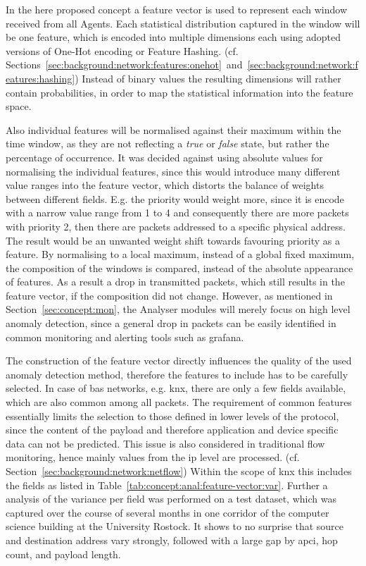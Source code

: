 In the here proposed concept a feature vector is used to represent each window received from all Agents. Each statistical distribution captured in the window will be one feature, which is encoded into multiple dimensions each using adopted versions of One-Hot encoding or Feature Hashing. (cf. Sections~\ref{sec:background:network:features:onehot}~and~\ref{sec:background:network:features:hashing})
Instead of binary values the resulting dimensions will rather contain probabilities, in order to map the statistical information into the feature space.

Also individual features will be normalised against their maximum within the time window, as they are not reflecting a \emph{true} or \emph{false} state, but rather the percentage of occurrence.
It was decided against using absolute values for normalising the individual features, since this would introduce many different value ranges into the feature vector, which distorts the balance of weights between different fields.
E.g. the priority would weight more, since it is encode with a narrow value range from 1 to 4 and consequently there are more packets with priority 2, then there are packets addressed to a specific physical address. The result would be an unwanted weight shift towards favouring priority as a feature.
By normalising to a local maximum, instead of a global fixed maximum, the composition of the windows is compared, instead of the absolute appearance of features.
As a result a drop in transmitted packets, which still results in the feature vector, if the composition did not change.
However, as mentioned in Section~\ref{sec:concept:mon}, the Analyser modules will merely focus on high level anomaly detection, since a general drop in packets can be easily identified in common monitoring and alerting tools such as \gls{grafana}.


The construction of the feature vector directly influences the quality of the used anomaly detection method, therefore the features to include has to be carefully selected. In case of \gls{bas} networks, e.g. \gls{knx}, there are only a few fields available, which are also common among all packets. The requirement of common features essentially limits the selection to those defined in lower levels of the protocol, since the content of the payload and therefore application and device specific data can not be predicted.
This issue is also considered in traditional flow monitoring, hence mainly values from the \gls{ip} level are processed. (cf. Section~\ref{sec:background:network:netflow})
Within the scope of \gls{knx} this includes the fields as listed in Table~\ref{tab:concept:anal:feature-vector:var}. Further a analysis of the variance per field was performed on a test dataset, which was captured over the course of several months in one corridor of the computer science building at the University Rostock.
It shows to no surprise that source and destination address vary strongly, followed with a large gap by \gls{apci}, hop count, and payload length. 

